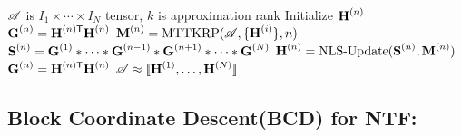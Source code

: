 \begin{algorithm}
\caption{$\CP = \text{NNCP}(\TA,k)$}
\label{alg:nncp}
\begin{algorithmic}[1]
\Require $\TA$ is $I_1\times \cdots \times I_N$ tensor, $k$ is approximation rank
\State {}
	\State Initialize $\Mn{H}{n}$ 
	\State $\Mn{G}{n} = \MnTra{H}{n}\Mn{H}{n}$
\EndFor
\State {}
	\State {}
	\State {}
	\State $\Mn{M}{n} = \text{MTTKRP}(\TA,\{\Mn{H}{i}\},n)$
	\State $\Mn{S}{n} = \Mn{G}{1} \Hada \cdots \Hada \Mn{G}{n-1} \Hada \Mn{G}{n+1} \Hada \cdots \Hada \Mn{G}{N}$
	\State $\Mn{H}{n} = \text{NLS-Update}(\Mn{S}{n},\Mn{M}{n})$
	\State $\Mn{G}{n} = \MnTra{H}{n}\Mn{H}{n}$
	\EndFor
\EndWhile
\Ensure $\TA \approx \CP$
\end{algorithmic}
\end{algorithm}

\subsection {Block Coordinate Descent(BCD) for NTF:}

